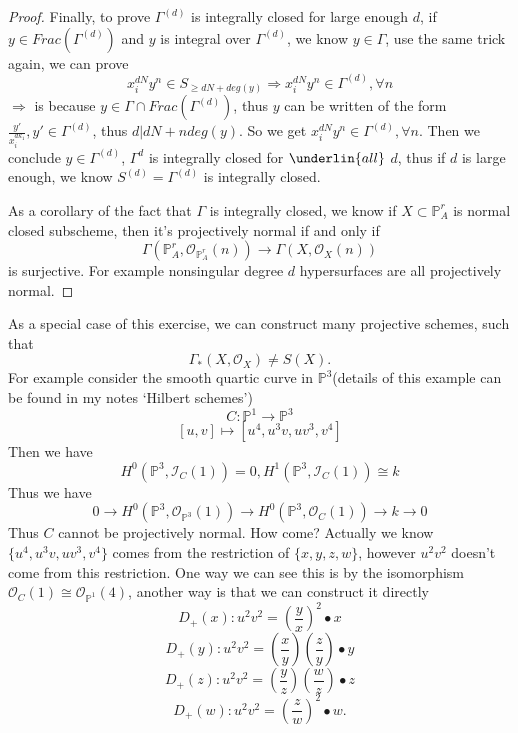 \documentclass[../main.tex]{subfiles}
\begin{document}
\begin{example}
\begin{proof}
Finally, to prove $\Gamma^(d)$ is integrally closed for large enough $d$, if $y\in Frac(\Gamma^{(d)})$ and $y$ is integral over $\Gamma^{(d)}$, we know $y\in \Gamma$, use the same trick again, we can prove
$$x_{i}^{dN}y^{n}\in S_{\geq dN+deg(y)}\Rightarrow x_{i}^{dN}y^{n}\in \Gamma^{(d)},\forall n$$
$\Rightarrow$ is because $y\in \Gamma\cap Frac(\Gamma^{(d)})$, thus $y$ can be written of the form $\frac{y'}{x_{i}^{dk_{1}}}, y'\in \Gamma^{(d)}$, thus $d|dN+ndeg(y)$. So we get $x_{i}^{dN}y^{n}\in \Gamma^{(d)},\forall n$. Then we conclude $y\in \Gamma^{(d)}$, $\Gamma^{d}$ is integrally closed for $\underlin{all}$ $d$, thus if $d$ is large enough, we know $S^{(d)}=\Gamma^{(d)}$ is integrally closed. 

As a corollary of the fact that $\Gamma$ is integrally closed, we know if $X\subset \mathbb{P}_{A}^{r}$ is normal closed subscheme, then it's projectively normal if and only if $$\Gamma(\mathbb{P}_{A}^{r}, \mathcal{O}_{\mathbb{P}_{A}^{r}}(n))\rightarrow \Gamma(X,\mathcal{O}_{X}(n))$$ is surjective. For example nonsingular degree $d$ hypersurfaces are all projectively normal.
\end{proof}

\end{example}
\begin{example}
As a special case of this exercise, we can construct many projective schemes, such that 
$$\Gamma_{*}(X,\mathcal{O}_{X})\neq S(X).$$
For example consider the smooth quartic curve in $\mathbb{P}^{3}$(details of this example can be found in my notes `Hilbert schemes')
$$C:\mathbb{P}^{1}\rightarrow \mathbb{P}^{3}$$
$$[u,v]\mapsto [u^{4},u^{3}v, uv^{3},v^{4}]$$
Then we have 
$$H^{0}(\mathbb{P}^{3}, \mathscr{I}_{C}(1))=0, H^{1}(\mathbb{P}^{3}, \mathscr{I}_{C}(1))\cong k$$
Thus we have 
$$0\rightarrow H^{0}(\mathbb{P}^{3},\mathcal{O}_{\mathbb{P}^{3}}(1))\rightarrow H^{0}(\mathbb{P}^{3}, \mathcal{O}_{C}(1))\rightarrow k \rightarrow 0$$
Thus $C$ cannot be projectively normal. How come? Actually we know $\{u^{4},u^{3}v,uv^{3},v^{4}\}$ comes from the restriction of $\{x,y,z,w\}$, however $u^{2}v^{2}$ doesn't come from this restriction. One way we can see this is by the isomorphism $\mathcal{O}_{C}(1)\cong \mathcal{O}_{\mathbb{P}^{1}}(4)$, another way is that we can construct it directly 
$$D_{+}(x): u^{2}v^{2}=(\frac{y}{x})^{2}\bullet x$$
$$D_{+}(y): u^{2}v^{2}=(\frac{x}{y})(\frac{z}{y})\bullet y$$
$$D_{+}(z): u^{2}v^{2}=(\frac{y}{z})(\frac{w}{z})\bullet z$$
$$D_{+}(w): u^{2}v^{2}=(\frac{z}{w})^{2}\bullet w.$$
\end{example}
\end{document}
